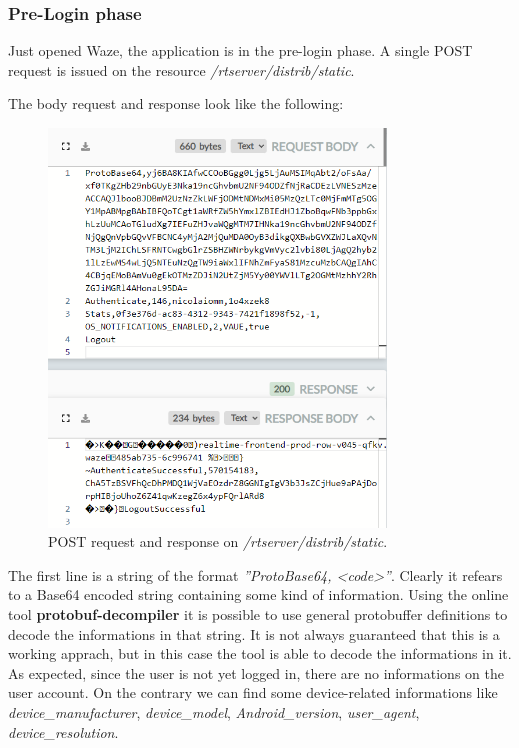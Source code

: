 		\subsubsection{Pre-Login phase}
			\par Just opened Waze, the application is in the pre-login phase. A single POST request is issued on the resource \textit{/rtserver/distrib/static}.\newline
			\par The body request and response look like the following:
			\begin{figure}[H]
				\centering
				\includegraphics[width=0.8\textwidth]{images/waze_staticbody.png}
				\caption{POST request and response on \textit{/rtserver/distrib/static}.}
			\end{figure}
			\par The first line is a string of the format \textit{''ProtoBase64, <code>''}. Clearly it refears to a Base64 encoded string containing some kind of information. Using the online tool \textbf{protobuf-decompiler} it is possible to use general protobuffer definitions to decode the informations in that string. It is not always guaranteed that this is a working apprach, but in this case the tool is able to decode the informations in it. As expected, since the user is not yet logged in, there are no informations on the user account. On the contrary we can find some device-related informations like \textit{device\_manufacturer}, \textit{device\_model}, \textit{Android\_version}, \textit{user\_agent}, \textit{device\_resolution}.\newline\newline
